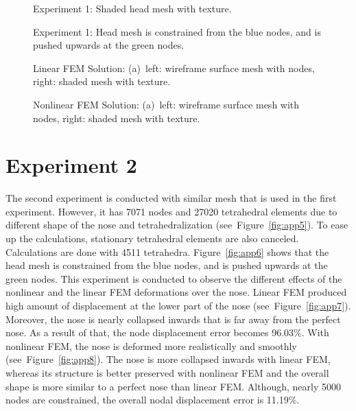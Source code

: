 \begin{figure}[h]
\centerline{}
\caption{Experiment 1: Shaded head mesh with texture.}
\label{fig:app2-1}
\end{figure}

\begin{figure}[h]
\centerline{}
\caption{Experiment 1: Head mesh is constrained from the blue nodes, and is pushed upwards at the green nodes.}
\label{fig:app2}
\end{figure}

\begin{figure}[h]
\centerline{}
\caption{Linear FEM Solution: (a)~left: wireframe surface mesh with nodes, right: shaded mesh with texture.}
\label{fig:app3}
\end{figure}

\begin{figure}[h]
\centerline{}
\caption{Nonlinear FEM Solution: (a)~left: wireframe surface mesh with nodes, right: shaded mesh with texture.}
\label{fig:app4}
\end{figure}

\clearpage
\section{Experiment 2}
\label{aii}

The second experiment is conducted with similar mesh that is used in the first experiment. However, it has 7071 nodes and 27020 tetrahedral elements due to different shape of the nose and tetrahedralization (see~Figure~\ref{fig:app5}). To ease up the calculations, stationary tetrahedral elements are also canceled. Calculations are done with 4511 tetrahedra. Figure~\ref{fig:app6} shows that the head mesh is constrained from the blue nodes, and is pushed upwards at the green nodes. This experiment is conducted to observe the different effects of the nonlinear and the linear FEM deformations over the nose. Linear FEM produced high amount of displacement at the lower part of the nose (see~Figure~\ref{fig:app7}). Moreover, the nose is nearly collapsed inwards that is far away from the perfect nose. As a result of that, the node displacement error becomes 96.03\%. With nonlinear FEM, the nose is deformed more realistically and smoothly (see~Figure~\ref{fig:app8}). The nose is more collapsed inwards with linear FEM, whereas its structure is better preserved with nonlinear FEM and the overall shape is more similar to a perfect nose than linear FEM. Although, nearly 5000 nodes are constrained, the overall nodal displacement error is 11.19\%.

